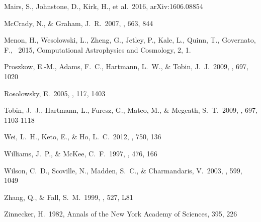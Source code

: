 \documentclass[iop]{emulateapj}
\begin{document}
\begin{thebibliography}
 Mairs, S., Johnstone, D., Kirk, H., et al.\ 2016, arXiv:1606.08854 

 McCrady, N., \& Graham, J.~R.\ 2007, \apj, 663, 844 




 Menon, H., Wesolowski, L., Zheng, G., Jetley, P., Kale, L., Quinn, T., Governato, F., \ 2015, Computational Astrophysics and Cosmology, 2, 1.

 Proszkow, E.-M., Adams, F.~C., Hartmann, L.~W., \& Tobin, J.~J.\ 2009, \apj, 697, 1020 


 Rosolowsky, E.\ 2005, 
\pasp, 117, 1403


 Tobin, J.~J., Hartmann, L., Furesz, G., Mateo, M., \& Megeath, S.~T.\ 2009, \apj, 697, 1103-1118 

 Wei, L.~H., Keto, E., 
\& Ho, L.~C.\ 2012, \apj, 750, 136

 Williams, J.~P., \& McKee, C.~F.\ 1997, \apj, 476, 166 


 Wilson, C.~D., Scoville, 
N., Madden, S.~C., \& Charmandaris, V.\ 2003, \apj, 599, 1049 


 Zhang, Q., \& Fall, S.~M.\ 1999, \apjl, 527, L81 

 Zinnecker, H.\ 1982, Annals 
of the New York Academy of Sciences, 395, 226 



\end{thebibliography}
\end{document}
